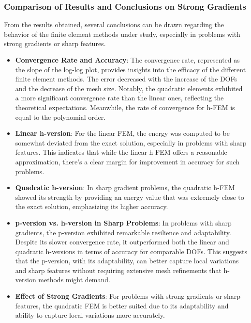 \documentclass[twoside,twocolumn,10pt]{article}
\begin{document}
\subsubsection{Comparison of Results and Conclusions on Strong Gradients}
From the results obtained, several conclusions can be drawn regarding the behavior of the finite element methods under study, especially in problems with strong gradients or sharp features.

\begin{itemize}
    \item \textbf{Convergence Rate and Accuracy}: The convergence rate, represented as the slope of the log-log plot, provides insights into the efficacy of the different finite element methods. The error decreased with the increase of the DOFs and the decrease of the mesh size. Notably, the quadratic elements exhibited a more significant convergence rate than the linear ones, reflecting the theoretical expectations. Meanwhile, the rate of convergence for h-FEM is equal to the polynomial order.
    
    \item \textbf{Linear h-version}: For the linear FEM, the energy was computed to be somewhat deviated from the exact solution, especially in problems with sharp features. This indicates that while the linear h-FEM offers a reasonable approximation, there's a clear margin for improvement in accuracy for such problems.
    
    \item \textbf{Quadratic h-version}: In sharp gradient problems, the quadratic h-FEM showed its strength by providing an energy value that was extremely close to the exact solution, emphasizing its higher accuracy.
    
    \item \textbf{p-version vs. h-version in Sharp Problems}: In problems with sharp gradients, the p-version exhibited remarkable resilience and adaptability. Despite its slower convergence rate, it outperformed both the linear and quadratic h-versions in terms of accuracy for comparable DOFs. This suggests that the p-version, with its adaptability, can better capture local variations and sharp features without requiring extensive mesh refinements that h-version methods might demand.
    
    \item \textbf{Effect of Strong Gradients}: For problems with strong gradients or sharp features, the quadratic FEM is better suited due to its adaptability and ability to capture local variations more accurately.
    

\end{itemize}
\end{document}
